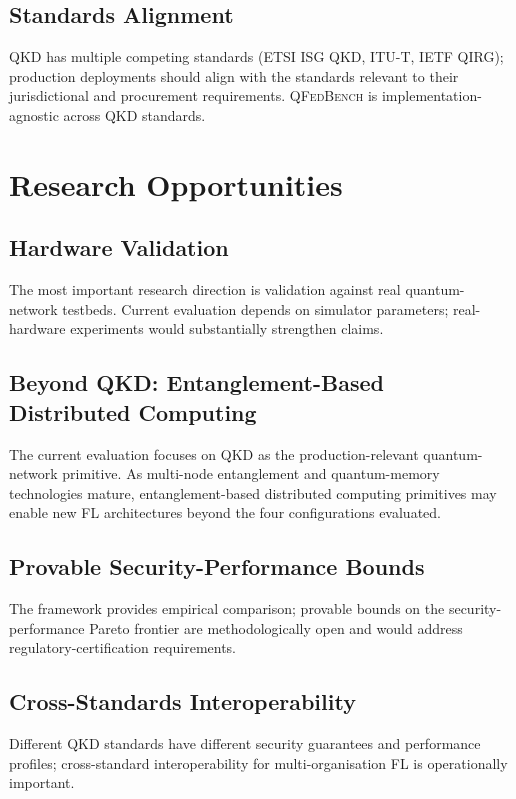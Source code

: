 \documentclass[sigconf,nonacm]{acmart}
\begin{document}
\subsection{Standards Alignment}

QKD has multiple competing standards (ETSI ISG QKD, ITU-T,
IETF QIRG); production deployments should align with the
standards relevant to their jurisdictional and procurement
requirements. \textsc{QFedBench} is implementation-agnostic
across QKD standards.

\section{Research Opportunities}

\subsection{Hardware Validation}

The most important research direction is validation against real
quantum-network testbeds. Current evaluation depends on simulator
parameters; real-hardware experiments would substantially
strengthen claims.

\subsection{Beyond QKD: Entanglement-Based Distributed Computing}

The current evaluation focuses on QKD as the
production-relevant quantum-network primitive. As multi-node
entanglement and quantum-memory technologies mature,
entanglement-based distributed computing primitives may enable
new FL architectures beyond the four configurations evaluated.

\subsection{Provable Security-Performance Bounds}

The framework provides empirical comparison; provable bounds on
the security-performance Pareto frontier are methodologically
open and would address regulatory-certification requirements.

\subsection{Cross-Standards Interoperability}

Different QKD standards have different security guarantees and
performance profiles; cross-standard interoperability for
multi-organisation FL is operationally important.
\end{document}
